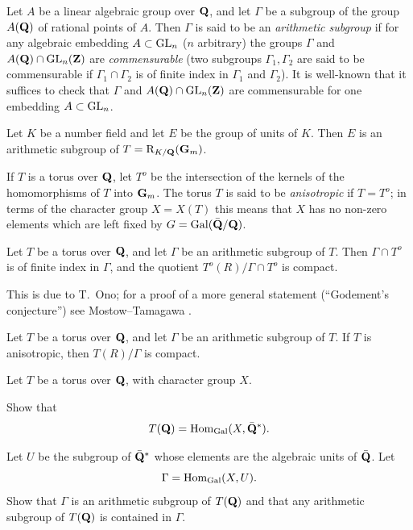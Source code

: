 

Let $A$ be a linear algebraic group over $\mathbf{Q}$, and let $\Gamma$ be a subgroup
of the group $A(\mathbf{Q})$ of rational points of $A$. Then $\Gamma$ is said to be an
\emph{arithmetic subgroup} if for any algebraic embedding $A\subset\mathrm{GL}_n$
($n$ arbitrary) the groups $\Gamma$ and $A(\mathbf{Q})\cap\mathrm{GL}_n(\mathbf{Z})$ are
\emph{commensurable} (two subgroups $\Gamma_1,\Gamma_2$ are said to be
commensurable if $\Gamma_1\cap\Gamma_2$ is of finite index in $\Gamma_1$ and
$\Gamma_2$). It is well-known that it suffices to check that $\Gamma$ and
$A(\mathbf{Q})\cap\mathrm{GL}_n(\mathbf{Z})$ are commensurable for one embedding $A\subset\mathrm{GL}_n$.


Let $K$ be a number field and let $E$ be the group of units of $K$. Then $E$
is an arithmetic subgroup of $T=\mathrm{R}_{K/\mathbf{Q}}(\mathbf{G}_m)$.

If $T$ is a torus over $\mathbf{Q}$, let $T^o$ be the intersection of the kernels of
the homomorphisms of $T$ into $\mathbf{G}_m$. The torus $T$ is said to be
\emph{anisotropic} if $T=T^o$; in terms of the character group $X=X(T)$ this
means that $X$ has no non-zero elements which are left fixed by
$G=\mathrm{Gal}(\bar{\mathbf{Q}}/\mathbf{Q})$.

\begin{theorem}
Let $T$ be a torus over $\mathbf{Q}$, and let $\Gamma$ be an arithmetic subgroup of
$T$. Then $\Gamma\cap T^o$ is of finite index in $\Gamma$, and the quotient
$T^o(R)/\Gamma\cap T^o$ is compact.
\end{theorem}

This is due to T.~Ono; for a proof of a more general statement
(``Godement's conjecture'') see Mostow--Tamagawa \cite{mostow-tamagawa}.

\begin{corollary}
Let $T$ be a torus over $\mathbf{Q}$, and let $\Gamma$ be an arithmetic subgroup of
$T$. If $T$ is anisotropic, then $T(R)/\Gamma$ is compact.
\end{corollary}


Let $T$ be a torus over $\mathbf{Q}$, with character group $X$.
\begin{alist}
\item[\emph{a})] Show that
\[
T(\mathbf{Q})=\mathrm{Hom}_{\mathrm{Gal}}(X,\bar{\mathbf{Q}}^*).
\]
\item[\emph{b})] Let $U$ be the subgroup of $\bar{\mathbf{Q}}^*$ whose elements are
the algebraic units of $\bar{\mathbf{Q}}$. Let
\[
\Gamma=\mathrm{Hom}_{\mathrm{Gal}}(X,U).
\]
Show that $\Gamma$ is an arithmetic subgroup of $T(\mathbf{Q})$ and that any
arithmetic subgroup of $T(\mathbf{Q})$ is contained in $\Gamma$.
\end{alist}

